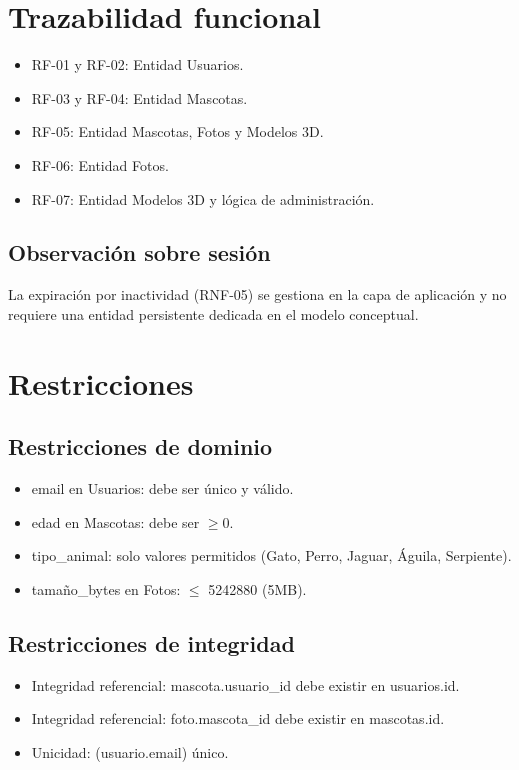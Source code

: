 \documentclass[12pt,a4paper]{article}
\begin{document}
\section{Trazabilidad funcional}
\begin{itemize}[leftmargin=*]
    \item RF-01 y RF-02: Entidad Usuarios.
    \item RF-03 y RF-04: Entidad Mascotas.
    \item RF-05: Entidad Mascotas, Fotos y Modelos 3D.
    \item RF-06: Entidad Fotos.
    \item RF-07: Entidad Modelos 3D y l\'ogica de administraci\'on.
\end{itemize}

\subsection{Observaci\'on sobre sesi\'on}
La expiraci\'on por inactividad (RNF-05) se gestiona en la capa de aplicaci\'on y no requiere una entidad persistente dedicada en el modelo conceptual.

\section{Restricciones}

\subsection{Restricciones de dominio}
\begin{itemize}[leftmargin=*]
    \item email en Usuarios: debe ser \'unico y v\'alido.
    \item edad en Mascotas: debe ser $\geq 0$.
    \item tipo\_animal: solo valores permitidos (Gato, Perro, Jaguar, \'Aguila, Serpiente).
    \item tama\~no\_bytes en Fotos: $\leq$ 5242880 (5MB).
\end{itemize}

\subsection{Restricciones de integridad}
\begin{itemize}[leftmargin=*]
    \item Integridad referencial: mascota.usuario\_id debe existir en usuarios.id.
    \item Integridad referencial: foto.mascota\_id debe existir en mascotas.id.
    \item Unicidad: (usuario.email) \'unico.
\end{itemize}
\end{document}
